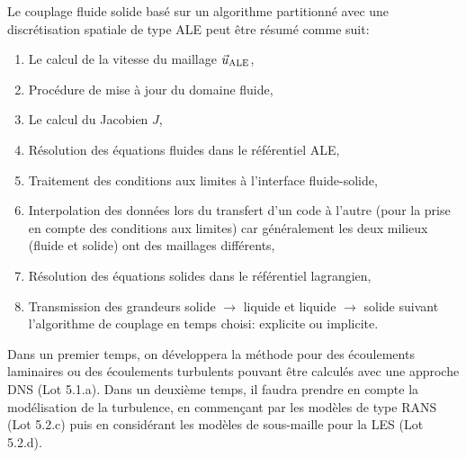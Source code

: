 Le couplage fluide solide bas\'e sur un algorithme partitionn\'e avec une discr\'etisation spatiale de type ALE peut \^etre  r\'esum\'e comme suit:

\begin{enumerate}
\item Le calcul de la vitesse du maillage $\vale$,
\item Proc\'edure de mise \`a jour du domaine fluide, 
\item Le calcul du Jacobien $J$,
\item R\'esolution des \'equations fluides dans le r\'ef\'erentiel ALE,
\item Traitement des conditions aux limites \`a l'interface fluide-solide,
\item Interpolation des donn\'ees lors du transfert d'un code  \`a l'autre (pour la prise en compte des conditions aux limites) car g\'en\'eralement les deux milieux (fluide et solide) ont des maillages  diff\'erents,
\item R\'esolution des \'equations solides dans le r\'ef\'erentiel lagrangien,
\item Transmission des grandeurs solide $\rightarrow$ liquide et liquide $\rightarrow$ solide suivant l'algorithme de couplage en temps choisi: explicite ou implicite.
\end{enumerate}



Dans un premier temps, on d\'eveloppera la m\'ethode pour des \'ecoulements laminaires ou des \'ecoulements turbulents pouvant \^etre calcul\'es avec une approche DNS (Lot
5.1.a). Dans un deuxi\`eme temps, il faudra prendre en compte la mod\'elisation de la turbulence, en commen\c cant par les mod\`eles de type RANS (Lot 5.2.c) puis en consid\'erant les mod\`eles de sous-maille pour la LES (Lot 5.2.d).


